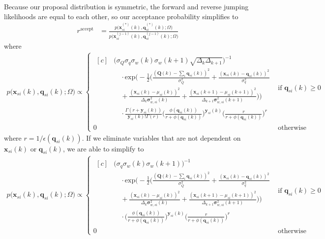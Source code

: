\documentclass{article}
\newcommand{\var}{\sigma^2}
\newcommand{\std}{\sigma}
\newcommand{\x}[2]{\mathbf{x}_{#2}(#1)}
\newcommand{\xexp}[3]{\mathbf{x}^{#3}_{#2}(#1)}
\newcommand{\q}[2]{\mathbf{q}_{#2}(#1)}
\newcommand{\qexp}[3]{\mathbf{q}^{#3}_{#2}(#1)}
\newcommand{\Q}{\mathbf{Q}}
\newcommand{\y}[2]{\mathbf{y}_{#2}(#1)}
\newcommand{\varw}[1]{\mathbf{\sigma}^2_{w,{}#1}}
\newcommand{\dt}{\Delta_{k}}
\begin{document}
Because our proposal distribution is symmetric, the forward and reverse jumping likelihoods are equal to each other, so our acceptance probability simplifies to
\begin{align}
	r^{\text{accept}} & = \frac
		{p \Big( \xexp{k}{si}{(*)}, \qexp{k}{si}{(*)}; \Omega \Big)}
		{p \Big( \xexp{k}{si}{(j-1)}, \qexp{k}{si}{(j-1)}; \Omega \Big)}
\end{align}
where
\begin{align*}
	p \Big( \x{k}{si}, \q{k}{si}; \Omega \Big) \propto \begin{cases}
    \begin{aligned}[c]
      & \Big( \sigma_Q \sigma_q \std_w(k) \std_w(k+1) \sqrt{\dt \Delta_{k+1}} \Big)^{-1} \\
      & \quad \cdot \text{exp}
        \Big(
        -\frac{1}{2}
        \Big(
            \frac{(\Q(k) - \sum_i \q{k}{si})^2}{\var_Q}
            + \frac{(\x{k}{si} - \q{k}{si})^2}{\var_q} \\
      & \quad +
        \frac{(\x{k}{si} - \mu_{si}(k))^2}{\dt \varw{si}(k)}
        + \frac{(\x{k+1}{si} - \mu_{si}(k+1))^2}{\Delta_{k+1} \varw{si}(k+1)}
        \Big) \Big) \\
      & \quad \cdot \frac{\Gamma(r+\y{k}{si})}{\y{k}{si}!\Gamma(r)}
        \Big(
            \frac{\phi(\q{k}{si})}{r+\phi(\q{k}{si})}
        \Big)^{\y{k}{si}}
        \Big(
            \frac{r}{r+\phi(\q{k}{si})}
        \Big)^{r}
    \end{aligned} & \text{if } \q{k}{si} \ge 0 \\
    0 & \text{otherwise}
\end{cases}
\end{align*}
  where $r = 1/\epsilon(\q{k}{si})$. If we eliminate variables that are not dependent on $\x{k}{si}$ or $\q{k}{si}$, we are able to simplify  to
  \begin{align*}
  	p \Big( \x{k}{si}, \q{k}{si}; \Omega \Big) \propto \begin{cases}
      \begin{aligned}[c]
        & \Big( \sigma_q \std_w(k) \std_w(k+1) \Big)^{-1} \\
        & \quad \cdot \text{exp}
          \Big(
          -\frac{1}{2}
          \Big(
              \frac{(\Q(k) - \sum_i \q{k}{si})^2}{\var_Q}
              + \frac{(\x{k}{si} - \q{k}{si})^2}{\var_q} \\
        & \quad +
          \frac{(\x{k}{si} - \mu_{si}(k))^2}{\dt \varw{si}(k)}
          + \frac{(\x{k+1}{si} - \mu_{si}(k+1))^2}{\Delta_{k+1} \varw{si}(k+1)}
          \Big) \Big) \\
        & \quad \cdot \Big(
            \frac{\phi(\q{k}{si})}{r+\phi(\q{k}{si})}
            \Big)^{\y{k}{si}}
          \Big(
              \frac{r}{r+\phi(\q{k}{si})}
          \Big)^{r}
      \end{aligned} & \text{if } \q{k}{si} \ge 0 \\
      0 & \text{otherwise}
  \end{cases}
\end{align*}
\end{document}
